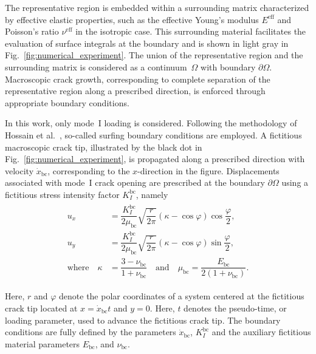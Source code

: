 \documentclass[pdflatex,sn-mathphys-num]{sn-jnl}%
\theoremstyle{thmstyleone}%
\theoremstyle{thmstyletwo}%
\theoremstyle{thmstylethree}%
\begin{document}
The representative  region  is embedded within a surrounding matrix characterized by effective elastic properties, 
such as the effective Young's modulus $E^{\text{eff}}$ and Poisson's ratio $\nu^{\text{eff}}$ in the isotropic case.
This surrounding material facilitates the evaluation of surface integrals at the boundary and is shown in light gray in Fig.~\ref{fig:numerical_experiment}.
The union of the representative region and the surrounding matrix is considered as a continuum~$\Omega$ with boundary $\partial\Omega$. 
Macroscopic crack growth, corresponding to complete separation of the representative region along a prescribed direction, is enforced through appropriate boundary conditions.

In this work, only mode~I loading is considered.
Following the methodology of Hossain et al.~\cite{hossain_effective_2014}, so-called surfing boundary conditions are employed.
A fictitious macroscopic crack tip, illustrated by the black dot in Fig.~\ref{fig:numerical_experiment}, is propagated along a prescribed direction with velocity $\dot{x}_{\text{bc}}$, 
corresponding to the $x$-direction in the figure.
Displacements associated with mode~I crack opening are prescribed at the boundary $\partial\Omega$ using a fictitious 
stress intensity factor $K_I^{\text{bc}}$, namely
\begin{align}
    \begin{split}
        u_x &= \dfrac{K_I^{\text{bc}}}{2\mu_{\text{bc}}}  \sqrt{\dfrac{r}{2\pi}}\left(\kappa - \cos{\varphi}\right)\cos{\dfrac{\varphi}{2}},\\
        u_y &= \dfrac{K_I^{\text{bc}}}{2\mu_{\text{bc}}}  \sqrt{\dfrac{r}{2\pi}}\left(\kappa - \cos{\varphi}\right)\sin{\dfrac{\varphi}{2}},\\
        \text{where} \quad \kappa &= \dfrac{3 - \nu_{\text{bc}}}{1 + \nu_{\text{bc}}} \quad \text{and} \quad \mu_{\text{bc}} = \dfrac{E_{\text{bc}}}{2\left(1 + \nu_{\text{bc}}\right)}.
        \label{eq:surfing-bcs}
    \end{split}
\end{align}

Here, $r$ and $\varphi$ denote the polar coordinates of a system centered at the fictitious 
crack tip located at $x = \dot{x}_{\text{bc}} t$ and $y = 0$.
Here, $t$ denotes the pseudo-time, or loading parameter, used to advance the fictitious crack tip.
The boundary conditions are fully defined by the 
parameters $\dot{x}_{\text{bc}}$, $K_I^{\text{bc}}$ and the auxiliary fictitious material parameters  
$E_{\text{bc}}$, and $\nu_{\text{bc}}$.
\end{document}

